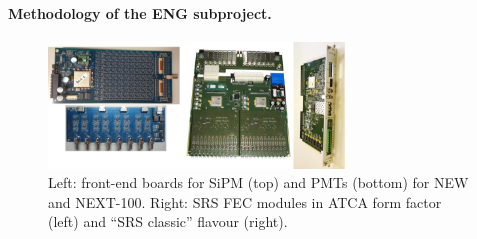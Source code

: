 \paragraph{Methodology of the ENG subproject.}

\begin{figure}[h!]
\begin{center}
\includegraphics[width=0.7\textwidth]{img/Electronics.jpg}
\end{center}
\caption{\label{Fig:FEE}\small Left: front-end boards for SiPM (top) and PMTs (bottom) for NEW and NEXT-100. Right: SRS FEC modules in ATCA form factor (left) and “SRS classic” flavour (right).}
\end{figure}

